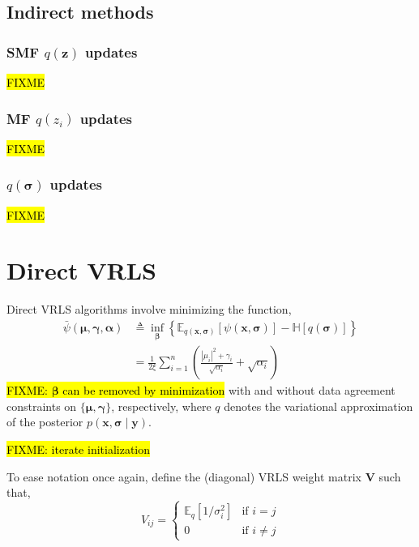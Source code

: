 \documentclass{article}
\newcommand{\m}[1]{\boldsymbol{#1}}
\newcommand{\E}[2]{\mathbb{E}_{#2}\left[ #1 \right]}
\newcommand{\entropy}[1]{\mathbb{H}\left[ #1 \right]}
\begin{document}
\subsection{Indirect methods}
\label{ss:var_indirect}

\subsubsection{SMF $q(\m{z})$ updates}
\hl{FIXME}

\subsubsection{MF $q(z_i)$ updates}
\hl{FIXME}

\subsubsection{$q(\m{\sigma})$ updates}
\hl{FIXME}

\section{Direct VRLS}
\label{s:vrls}
Direct VRLS algorithms involve minimizing the function,
\begin{equation}
\begin{aligned}
\bar\psi(\m{\mu}, \m{\gamma}, \m{\alpha}) &\triangleq
 \inf_{\m{\beta}} \left\{
  \E{\psi(\m{x}, \m{\sigma})}{q(\m{x}, \m{\sigma})} -
  \entropy{q(\m{\sigma})}
 \right\}
\\ &=
 \frac{1}{2 \xi} \sum_{i=1}^n \left(
  \frac{|\mu_i|^2 + \gamma_i}{\sqrt{\alpha_i}} + \sqrt{\alpha_i}
 \right)
\end{aligned}
\label{eq:psibar}
\end{equation}
\hl{FIXME: $\m{\beta}$ can be removed by minimization}
with and without data agreement constraints on $\{\m{\mu}, \m{\gamma}\}$,
respectively, where $q$ denotes the variational approximation of the
posterior $p(\m{x}, \m{\sigma} \mid \m{y})$.

\hl{FIXME: iterate initialization}

To ease notation once again, define
the (diagonal) VRLS weight matrix $\m{V}$ such that,
\begin{equation}
V_{ij} = \begin{cases}
 \E{1 / \sigma_i^2}{q} &\text{if } i = j \\
 0 &\text{if } i \ne j
\end{cases}
\label{eq:vmatrix}
\end{equation}
\end{document}

